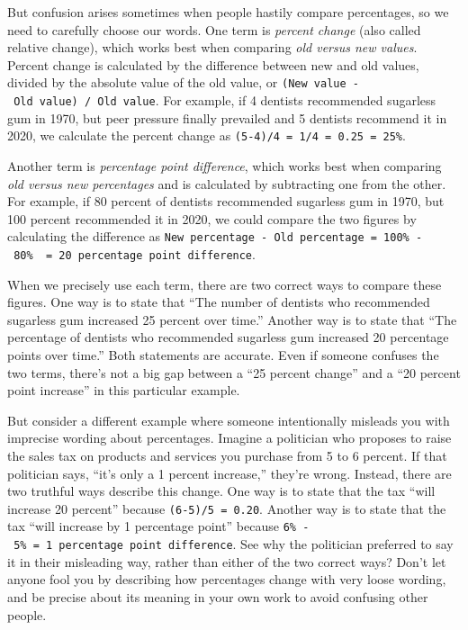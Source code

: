 \documentclass[
  english,
]{book}
\begin{document}
But confusion arises sometimes when people hastily compare percentages, so we need to carefully choose our words. One term is \emph{percent change} (also called relative change), which works best when comparing \emph{old versus new values}. Percent change is calculated by the difference between new and old values, divided by the absolute value of the old value, or \texttt{(New\ value\ -\ Old\ value)\ /\ \textbar{}Old\ value\textbar{}}. For example, if 4 dentists recommended sugarless gum in 1970, but peer pressure finally prevailed and 5 dentists recommend it in 2020, we calculate the percent change as \texttt{(5-4)/4\ =\ 1/4\ =\ 0.25\ =\ 25\%}.

Another term is \emph{percentage point difference}, which works best when comparing \emph{old versus new percentages} and is calculated by subtracting one from the other. For example, if 80 percent of dentists recommended sugarless gum in 1970, but 100 percent recommended it in 2020, we could compare the two figures by calculating the difference as \texttt{New\ percentage\ -\ Old\ percentage\ =\ 100\%\ -\ 80\%\ \ =\ 20\ percentage\ point\ difference}.

When we precisely use each term, there are two correct ways to compare these figures. One way is to state that ``The number of dentists who recommended sugarless gum increased 25 percent over time.'' Another way is to state that ``The percentage of dentists who recommended sugarless gum increased 20 percentage points over time.'' Both statements are accurate. Even if someone confuses the two terms, there's not a big gap between a ``25 percent change'' and a ``20 percent point increase'' in this particular example.

But consider a different example where someone intentionally misleads you with imprecise wording about percentages. Imagine a politician who proposes to raise the sales tax on products and services you purchase from 5 to 6 percent. If that politician says, ``it's only a 1 percent increase,'' they're wrong. Instead, there are two truthful ways describe this change. One way is to state that the tax ``will increase 20 percent'' because \texttt{(6-5)/5\ =\ 0.20}. Another way is to state that the tax ``will increase by 1 percentage point'' because \texttt{6\%\ -\ 5\%\ =\ 1\ percentage\ point\ difference}. See why the politician preferred to say it in their misleading way, rather than either of the two correct ways? Don't let anyone fool you by describing how percentages change with very loose wording, and be precise about its meaning in your own work to avoid confusing other people.
\end{document}
